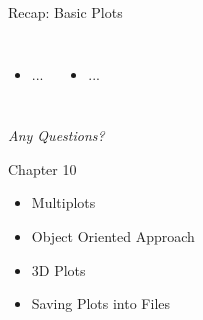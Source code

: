 
\begin{frame}[t,plain]
\titlepage
\end{frame}


\begin{frame}{Recap: Basic Plots}
%
\begin{columns}[T]
\begin{itemize}
\item ...
\end{itemize}
%
\begin{itemize}
\item ...
\end{itemize}
\end{columns}
%
\begin{center}
	\emph{Any Questions?}
\end{center}
%
\end{frame}


\begin{frame}[fragile]{Chapter 10}
%
\begin{itemize}
\item Multiplots
\item Object Oriented Approach
\item 3D Plots
\item Saving Plots into Files
\end{itemize}
%
\end{frame}
